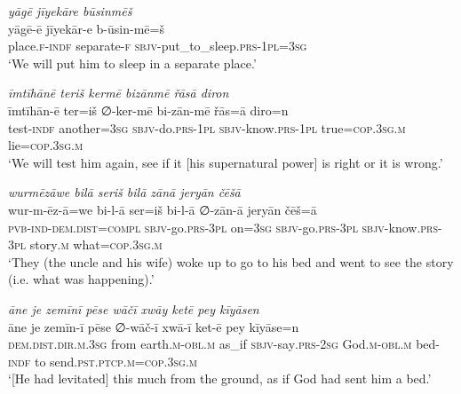 \ea \label{ŽP.63}
\textit{yāgē jīyekāre būsinmēš} \\ 
\gll yāgē-ē jīyekār-e b-ūsin-mē=š \\ 
 place\textsc{.f}\textsc{-indf} separate\textsc{-f} \textsc{sbjv-}put\_to\_sleep\textsc{.prs}\textsc{-1pl}\textsc{=3sg} \\ 
\glt `We will put him to sleep in a separate place.'
\z 
 
\ea \label{ŽP.64}
\textit{īmtīhānē teriš kermē bizānmē řāsā diron} \\ 
\gll īmtīhān-ē ter=iš ∅-ker-mē bi-zān-mē řās=ā diro=n \\ 
 test\textsc{-indf} another\textsc{=3sg} \textsc{sbjv-}do\textsc{.prs}\textsc{-1pl} \textsc{sbjv-}know\textsc{.prs}\textsc{-1pl} true\textsc{=cop}\textsc{.3sg}\textsc{.m} lie\textsc{=cop}\textsc{.3sg}\textsc{.m} \\ 
\glt `We will test him again, see if it [his supernatural power] is right or it is wrong.'
\z 
 
\ea \label{ŽP.67}
\textit{wurmēzāwe bilā seriš bilā zānā jeryān čēšā} \\ 
\gll wur-m-ēz-ā=we bi-l-ā ser=iš bi-l-ā ∅-zān-ā jeryān čēš=ā \\ 
 \textsc{pvb-}\textsc{ind-}\textsc{dem.dist}\textsc{=compl} \textsc{sbjv-}go\textsc{.prs}\textsc{-3pl} on\textsc{=3sg} \textsc{sbjv-}go\textsc{.prs}\textsc{-3pl} \textsc{sbjv-}know\textsc{.prs}\textsc{-3pl} story\textsc{.m} what\textsc{=cop}\textsc{.3sg}\textsc{.m} \\ 
\glt `They (the uncle and his wife) woke up to go to his bed and went to see the story (i.e. what was happening).'
\z 
 
\ea \label{ŽP.69}
\textit{āne je zemīnī pēse wāčī xwāy ketē pey kīyāsen} \\ 
\gll āne je zemīn-ī pēse ∅-wāč-ī xwā-ī ket-ē pey kīyāse=n \\ 
 \textsc{dem.dist}\textsc{.dir}\textsc{.m}\textsc{.3sg} from earth\textsc{.m}\textsc{-obl}\textsc{.m} as\_if \textsc{sbjv-}say\textsc{.prs-}\textsc{2sg} God\textsc{.m}\textsc{-obl}\textsc{.m} bed\textsc{-indf} to send\textsc{.pst}\textsc{.ptcp}\textsc{.m}\textsc{=cop}\textsc{.3sg}\textsc{.m} \\ 
\glt `[He had levitated] this much from the ground, as if God had sent him a bed.'
\z 
 
